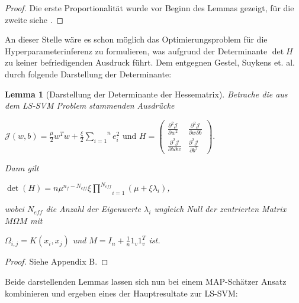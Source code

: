 \documentclass{report}
\theoremstyle{linebreak}
\newtheorem{lemma}[defi]{Lemma}
\begin{document}
\begin{proof}
Die erste Proportionalität wurde vor Beginn des Lemmas gezeigt, für die zweite siehe \cite{LS-SVM}.
\end{proof}

An dieser Stelle wäre es schon möglich das Optimierungsproblem für die Hyperparameterinferenz zu formulieren, was aufgrund der Determinante $\det H$ zu keiner befriedigenden Ausdruck führt. Dem entgegnen Gestel, Suykens et. al. durch folgende Darstellung der Determinante:

\begin{lemma}[Darstellung der Determinante der Hessematrix]
Betrache die aus dem LS-SVM Problem stammenden Ausdrücke 
\begin{center}
	$\mathcal{J}(w,b) = \frac{\mu}{2}w^T w + \frac{\xi}{2}\overset{n}{\underset{i=1}			{\sum}} e_i ^2 \text{ und } H = \begin{pmatrix}
	\frac{\partial^2 \mathcal{J}}{\partial w^2 } & \frac{\partial^2 \mathcal{J}}				{\partial w \partial b } \\
	\frac{\partial^2 \mathcal{J}}{\partial b \partial w } & \frac{\partial^2 					\mathcal{J}}{\partial b^2 }
	\end{pmatrix}.$
\end{center}

Dann gilt

\begin{center}
	$\det(H) = n \mu^{n_f - N_{eff}} \xi \underset{i=1}{\overset{N_{eff}}{\prod}}(\mu + 			\xi \lambda_i)$,
\end{center}

wobei $N_{eff}$ die Anzahl der Eigenwerte $\lambda_i$ ungleich Null der zentrierten Matrix $M \Omega M$ mit
\begin{center}
	$\Omega_{i,j} = K(x_i, x_j)$ und $M = I_n + \frac{1}{n} 1_v 1_v^T$ ist.
\end{center}
\end{lemma}

\begin{proof}
Siehe \cite{LS-SVM} Appendix B.
\end{proof}

Beide darstellenden Lemmas lassen sich nun bei einem MAP-Schätzer Ansatz kombinieren und ergeben eines der Hauptresultate zur LS-SVM:
\end{document}

